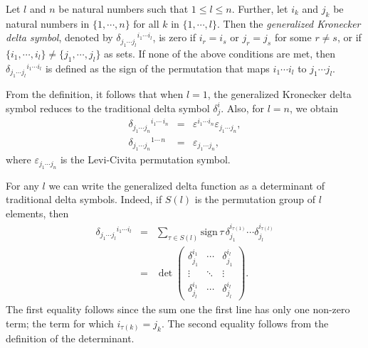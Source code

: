 \documentclass[12pt]{article}
\begin{document}
Let $l$ and $n$ be natural numbers such that $1\le l \le n$. 
Further,  let $i_k$  and $j_k$ be natural numbers in $\{1,\cdots, n\}$ 
for all $k$ in $\{1,\cdots, l\}$. 
Then the
\emph{generalized Kronecker delta symbol}, denoted by 
$\delta_{j_1\cdots j_l}\!\!\!\!\!\!\!\!\!\!^{i_1\cdots i_l}$, 
is zero if $i_r=i_s$ 
or $j_r=j_s$ for some $r\neq s$, or if
$\{i_1,\cdots, i_l\} \neq \{j_1,\cdots, j_l\}$ as sets.
If none of the above conditions are met, then 
$\delta_{j_1\cdots j_l}\!\!\!\!\!\!\!\!\!\!^{i_1\cdots i_l}$ 
is defined as the sign of the permutation that maps
$i_1\cdots i_l$ to $j_1\cdots j_l$.

From the definition, it follows that when $l=1$, 
the generalized Kronecker delta symbol reduces to 
the traditional delta symbol $\delta^i_j$. 
Also, for $l=n$, we obtain 
\begin{eqnarray*}
\delta_{j_1\cdots j_n}\!\!\!\!\!\!\!\!\!\!\!\!^{i_1\cdots \,i_n}&=&\varepsilon^{i_1\cdots i_n}\varepsilon_{j_1\cdots j_n},\\
\delta_{j_1\cdots j_n}\!\!\!\!\!\!\!\!\!\!\!\!^{1\cdots \,n}&=&\varepsilon_{j_1\cdots j_n},
\end{eqnarray*}
where $\varepsilon_{j_1\cdots j_n}$ is the Levi-Civita permutation symbol.

For any $l$ we can write the generalized delta function 
as a determinant of traditional delta symbols. Indeed,
if $S(l)$ is the permutation group of $l$ elements, then 
\begin{eqnarray*}
\delta_{j_1\cdots j_l}\!\!\!\!\!\!\!\!\!\!\!^{i_1\cdots i_l} &=& \sum_{\tau\in S(l)} \mbox{sign} \, \tau\, \delta^{i_{\tau(1)}}_{j_1}\cdots \delta^{i_{\tau(l)}}_{j_l} \\
&=& \det \left(  \begin {array}{lll} \delta^{i_1}_{j_1} & \cdots & \delta^{i_l}_{j_1} \\
   \vdots & \ddots & \vdots \\
   \delta^{i_1}_{j_l} &  \cdots & \delta^{i_l}_{j_l} 
    \end{array} \right).
\end{eqnarray*}
The first equality follows since the sum one the first line has only one non-zero term; the term for
which $i_{\tau(k)} = j_k$. The second equality follows from the 
definition of the determinant.
\end{document}
